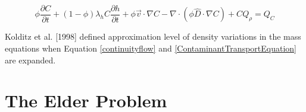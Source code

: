 \begin{equation}\label{ContaminantTransportExpandedEquation}
\phi \frac{{\partial C}}{{\partial t}} + \left( {1 - \phi }
\right)\lambda _h C\frac{{\partial h}}{{\partial t}} + \phi \vec v
\cdot \nabla C - \nabla  \cdot \left( {\phi \hat D \cdot \nabla C}
\right) + CQ_\rho   = Q_C
\end{equation}

Kolditz et al. [1998] defined approximation level of density
variations in the mass equations when Equation \ref{continuityflow}
and \ref{ContaminantTransportEquation} are expanded.


\section{The Elder Problem}

